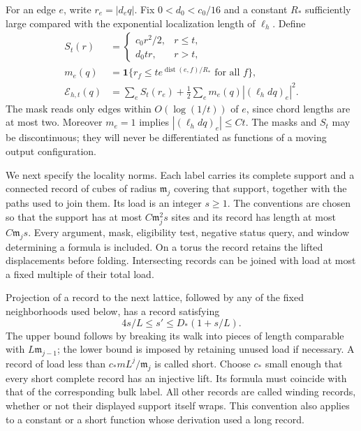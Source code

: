 For an edge $e$, write $r_e=|d_eq|$.  Fix $0<d_0<c_0/16$ and a constant
$R_*$ sufficiently large compared with the exponential localization
length of $\ell_h$.  Define
\begin{align}
 S_t(r)&=\begin{cases}c_0r^2/2,&r\le t,\\d_0tr,&r>t,\end{cases}
 \nonumber\\
 m_e(q)&=\mathbf1\{r_f\le t e^{\operatorname{dist}(e,f)/R_*}
                                  \text{ for all }f\},\nonumber\\
 \mathcal E_{h,t}(q)&=\sum_eS_t(r_e)
       +\frac12\sum_em_e(q)| (\ell_hdq)_e|^2.
 \label{rg:kinetic}
\end{align}
The mask reads only edges within $O(\log(1/t))$ of $e$, since chord
lengths are at most two.  Moreover $m_e=1$ implies
$| (\ell_hdq)_e|\le Ct$.  The masks and $S_t$ may be discontinuous;
they will never be differentiated as functions of a moving output
configuration.

We next specify the locality norms.  Each label carries its complete
support and a connected record of cubes of radius $\mathfrak m_j$ covering that
support, together with the paths used to join them.  Its load is an
integer $s\ge1$.  The conventions are chosen so that the support has at
most $C\mathfrak m_j^2s$ sites and its record has length at most $C\mathfrak m_js$.
Every argument, mask, eligibility test, negative status query, and
window determining a formula is included.  On a torus the record retains
the lifted displacements before folding.  Intersecting records can be
joined with load at most a fixed multiple of their total load.

Projection of a record to the next lattice, followed by any of the
fixed neighborhoods used below, has a record satisfying
\begin{equation}
 4s/L\le s'\le D_*(1+s/L).
 \label{rg:projection}
\end{equation}
The upper bound follows by breaking its walk into pieces of length
comparable with $L\mathfrak m_{j-1}$; the lower bound is imposed by retaining
unused load if necessary.  A record of load less than
$c_*mL^j/\mathfrak m_j$ is called short.  Choose $c_*$ small enough that every
short complete record has an injective lift.  Its formula must coincide
with that of the corresponding bulk label.  All other records are
called winding records, whether or not their displayed support itself
wraps.  This convention also applies to a constant or a short function
whose derivation used a long record.

